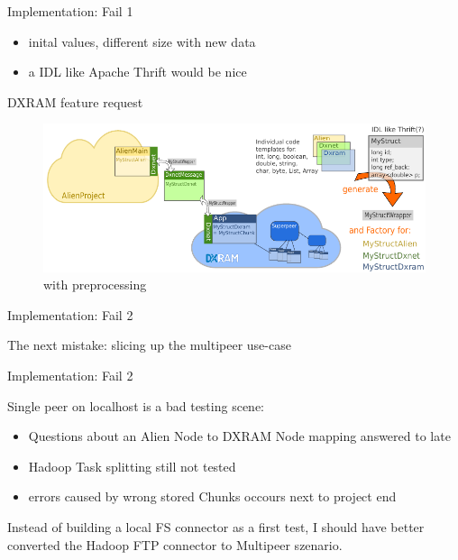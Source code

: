 \begin{frame}{Implementation: Fail 1}
\protect\hypertarget{implementation-fail-1-1}{}

\begin{itemize}
\tightlist
\item
  inital values, different size with new data
\item
  a IDL like Apache Thrift would be nice
\end{itemize}

\end{frame}

\begin{frame}{DXRAM feature request}
\protect\hypertarget{dxram-feature-request}{}

\begin{figure}
\centering
\includegraphics{fig/structAPI.pdf}
\caption{with preprocessing}
\end{figure}

\end{frame}

\begin{frame}{Implementation: Fail 2}
\protect\hypertarget{implementation-fail-2}{}

The next mistake: slicing up the multipeer use-case

\end{frame}

\begin{frame}{Implementation: Fail 2}
\protect\hypertarget{implementation-fail-2-1}{}

Single peer on localhost is a bad testing scene:

\begin{itemize}
\tightlist
\item
  Questions about an Alien Node to DXRAM Node mapping answered to late
\item
  Hadoop Task splitting still not tested
\item
  errors caused by wrong stored Chunks occours next to project end
\end{itemize}

Instead of building a local FS connector as a first test, I should have
better converted the Hadoop FTP connector to Multipeer szenario.

\end{frame}

